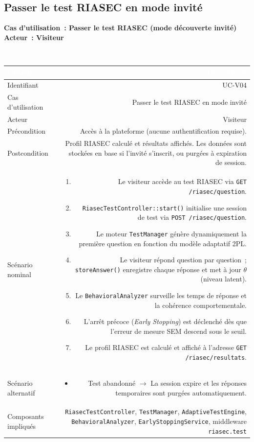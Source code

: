 \documentclass[a4paper,12pt]{article}
\newcommand{\ucheader}[2]{%
  \noindent\colorbox{capblue}{\parbox{\dimexpr\linewidth-2\fboxsep}{%
    \color{white}\bfseries\large Cas d'utilisation~: #1 \hfill \normalsize Acteur~: #2
  }}\\[2pt]
}
\begin{document}
\subsection{Passer le test RIASEC en mode invité}
\ucheader{Passer le test RIASEC (mode découverte invité)}{Visiteur}

\noindent
\begin{tabular}{|L|R|}
\hline
{}\textcolor{white}{\textbf{Champ}} & \textcolor{white}{\textbf{Description}} \\
\hline
{}Identifiant & UC-V04 \\
\hline
Cas d'utilisation & Passer le test RIASEC en mode invité \\
\hline
{}Acteur & Visiteur \\
\hline
Précondition & Accès à la plateforme (aucune authentification requise). \\
\hline
{}Postcondition & Profil RIASEC calculé et résultats affichés. Les données sont stockées en base si l'invité s'inscrit, ou purgées à expiration de session. \\
\hline
Scénario nominal &
\begin{enumerate}
  \item Le visiteur accède au test RIASEC via \texttt{GET /riasec/question}.
  \item \texttt{RiasecTestController::start()} initialise une session de test via \texttt{POST /riasec/question}.
  \item Le moteur \texttt{TestManager} génère dynamiquement la première question en fonction du modèle adaptatif 2PL.
  \item Le visiteur répond question par question~; \texttt{storeAnswer()} enregistre chaque réponse et met à jour $\theta$ (niveau latent).
  \item Le \texttt{BehavioralAnalyzer} surveille les temps de réponse et la cohérence comportementale.
  \item L'arrêt précoce (\textit{Early Stopping}) est déclenché dès que l'erreur de mesure SEM descend sous le seuil.
  \item Le profil RIASEC est calculé et affiché à l'adresse \texttt{GET /riasec/resultats}.
\end{enumerate} \\
\hline
{}Scénario alternatif &
\begin{itemize}
  \item Test abandonné $\rightarrow$ La session expire et les réponses temporaires sont purgées automatiquement.
\end{itemize} \\
\hline
Composants impliqués & \texttt{RiasecTestController}, \texttt{TestManager}, \texttt{AdaptiveTestEngine}, \texttt{BehavioralAnalyzer}, \texttt{EarlyStoppingService}, middleware \texttt{riasec.test} \\
\hline
\end{tabular}
\end{document}
